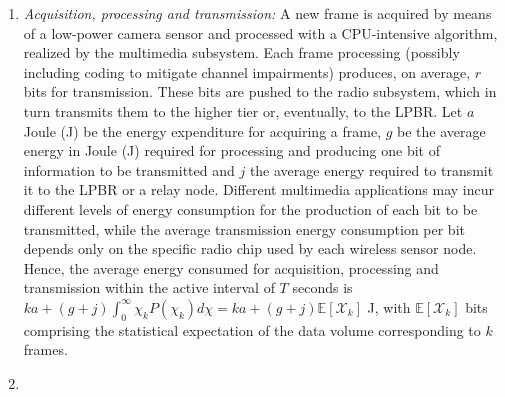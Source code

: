 \documentclass[twocolumn,english]{IEEEtran}
\theoremstyle{plain}
\theoremstyle{definition}
\begin{document}
\begin{enumerate}[leftmargin=*]
\item

\textit{Acquisition, processing and transmission: }A new frame is
acquired by means of a low-power camera sensor and processed with
a CPU-intensive algorithm, realized by the multimedia subsystem. Each
frame processing (possibly including coding to mitigate channel impairments)
produces, on average, $r$ bits for transmission. These bits are pushed
to the radio subsystem, which in turn transmits them to the higher
tier or, eventually, to the LPBR. Let $a$ Joule (J) be the energy
expenditure for acquiring a frame, $g$ be the average energy in Joule
(J) required for processing and producing one bit of information to
be transmitted and $j$ the average energy required to transmit it
to the LPBR or a relay node. Different multimedia applications may
incur different levels of energy consumption for the production of
each bit to be transmitted, while the average transmission energy
consumption per bit depends only on the specific radio chip used by
each wireless sensor node. Hence, the average energy consumed for
acquisition, processing and transmission within the active interval
of $T$ seconds is $ka+(g+j)\int_{0}^{\infty}\chi_{k}P(\chi_{k})d\chi=ka+(g+j)\mathbb{E}\left[\mathcal{X}_{k}\right]$
J, with $\mathbb{E}\left[\mathcal{X}_{k}\right]$ bits comprising
the statistical expectation of the data volume corresponding to $k$
frames.

\item


\end{enumerate}
\end{document}

